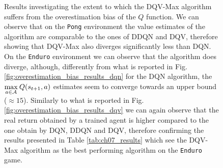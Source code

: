 \begin{figure}[ht!]
	\caption{Results investigating the extent to which the DQV-Max algorithm suffers from the overestimation bias of the $Q$ function. We can observe that on the \texttt{Pong} environment the value estimates of the algorithm are comparable to the ones of DDQN and DQV, therefore showing that DQV-Max also diverges significantly less than DQN. On the \texttt{Enduro} environment we can observe that the algorithm does diverge, although, differently from what is reported in Fig. \ref{fig:overestimation_bias_results_dqn} for the DQN algorithm, the $\underset{a \in \cal A}{\max}\:Q(s_{t+1}, a)$ estimates seem to converge towards an upper bound ($\approx 15$). Similarly to what is reported in Fig.\ref{fig:overestimation_bias_results_dqv} we can again observe that the real return obtained by a trained agent is higher compared to the one obtain by DQN, DDQN and DQV, therefore confirming the results presented in Table \ref{tab:ch07_results} which see the DQV-Max algorithm as the best performing algorithm on the \texttt{Enduro} game.}
	\label{fig:overestimation_bias_results_dqv_max} 
\end{figure}

